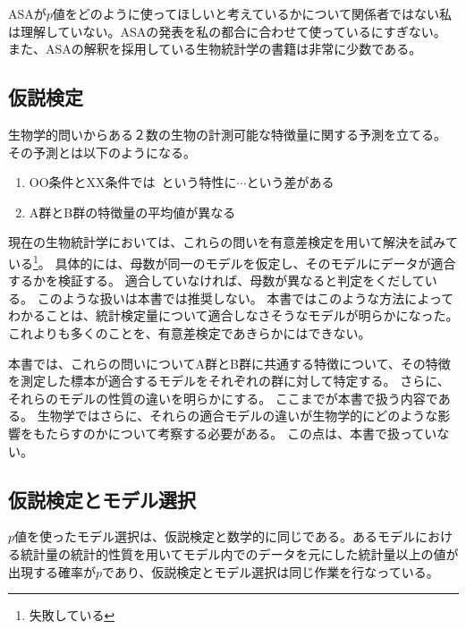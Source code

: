 
ASAが$p$値をどのように使ってほしいと考えているかについて関係者ではない私は理解していない。ASAの発表を私の都合に合わせて使っているにすぎない。
また、ASAの解釈を採用している生物統計学の書籍は非常に少数である。

\subsection{仮説検定}
生物学的問いからある２数の生物の計測可能な特徴量に関する予測を立てる。
その予測とは以下のようになる。
\begin{enumerate}
    \item OO条件とXX条件では~という特性に$\cdots$という差がある
    \item A群とB群の特徴量の平均値が異なる
\end{enumerate}
現在の生物統計学においては、これらの問いを有意差検定を用いて解決を試みている\footnote{失敗している}。
具体的には、母数が同一のモデルを仮定し、そのモデルにデータが適合するかを検証する。
適合していなければ、母数が異なると判定をくだしている。
このような扱いは本書では推奨しない。
本書ではこのような方法によってわかることは、統計検定量について適合しなさそうなモデルが明らかになった。
これよりも多くのことを、有意差検定であきらかにはできない。

本書では、これらの問いについてA群とB群に共通する特徴について、その特徴を測定した標本が適合するモデルをそれぞれの群に対して特定する。
さらに、それらのモデルの性質の違いを明らかにする。
ここまでが本書で扱う内容である。
生物学ではさらに、それらの適合モデルの違いが生物学的にどのような影響をもたらすのかについて考察する必要がある。
この点は、本書で扱っていない。


\subsection{仮説検定とモデル選択}
$p$値を使ったモデル選択は、仮説検定と数学的に同じである。あるモデルにおける統計量の統計的性質を用いてモデル内でのデータを元にした統計量以上の値が出現する確率が$p$であり、仮説検定とモデル選択は同じ作業を行なっている。

